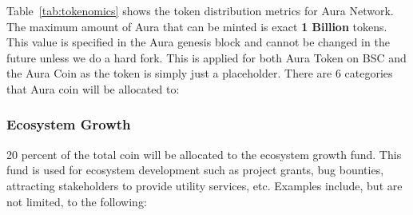 \documentclass[11pt, titlepage]{article}
\begin{document}
Table~\ref{tab:tokenomics} shows the token distribution metrics for Aura Network. The maximum amount of Aura that can be minted is exact \textbf{1 Billion} tokens. This value is specified in the Aura genesis block and cannot be changed in the future unless we do a hard fork. This is applied for both Aura Token on BSC and the Aura Coin as the token is simply just a placeholder. There are 6 categories that Aura coin will be allocated to:

\subsubsection{Ecosystem Growth}
20 percent of the total coin will be allocated to the ecosystem growth fund. This fund is used for ecosystem development such as project grants, bug bounties, attracting stakeholders to provide utility services, etc. Examples include, but are not limited, to the following: 
\end{document}
